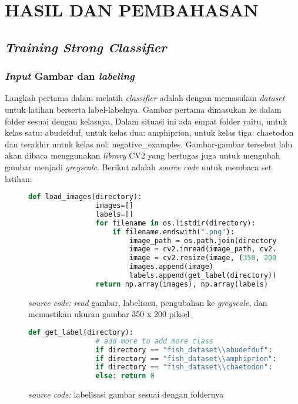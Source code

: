 
\chapter{HASIL DAN PEMBAHASAN}

\section{\textit{Training Strong Classifier}}
\subsection{\textit{Input} Gambar dan \textit{labeling}}
	Langkah pertama dalam melatih \textit{classifier} adalah dengan memasukan 
	\textit{dataset} untuk latihan berserta label-labelnya. Gambar pertama dimasukan 
	ke dalam folder sesuai dengan kelasnya. Dalam situasi ini ada empat folder yaitu, 
	untuk kelas satu: abudefduf, untuk kelas dua: amphiprion, untuk kelas tiga: chaetodon 
	dan terakhir untuk kelas nol: negative\_examples. Gambar-gambar tersebut lalu akan dibaca 
	menggunakan \textit{library} CV2 yang bertugas juga untuk mengubah gambar menjadi 
	\textit{greyscale}. Berikut adalah \emph{source code} 
	untuk membaca set latihan:

	\begin{figure}[H]
		\begin{lstlisting}[language=Python, basicstyle=\tiny]
			def load_images(directory):
				images=[]
				labels=[]
				for filename in os.listdir(directory):
					if filename.endswith(".png"):
						image_path = os.path.join(directory, filename)
						image = cv2.imread(image_path, cv2.IMREAD_GRAYSCALE)
						image = cv2.resize(image, (350, 200))
						images.append(image)
						labels.append(get_label(directory))
				return np.array(images), np.array(labels)
		\end{lstlisting}
		\caption{\emph{source code:} \textit{read} gambar, labelisasi, pengubahan ke \textit{greyscale}, 
		dan memastikan ukuran gambar 350 x 200 piksel}
		\label{code:pre-processing gambar}
	\end{figure}

	\begin{figure}[H]
		\begin{lstlisting}[language=Python, basicstyle=\tiny]
			def get_label(directory):
				# add more to add more class
				if directory == "fish_dataset\\abudefduf": return 1
				if directory == "fish_dataset\\amphiprion": return 2
				if directory == "fish_dataset\\chaetodon": return 3
				else: return 0
		\end{lstlisting}
		\caption{\emph{source code:} labelisasi gambar sesuai dengan foldernya}
		\label{code:labeling}
	\end{figure}

